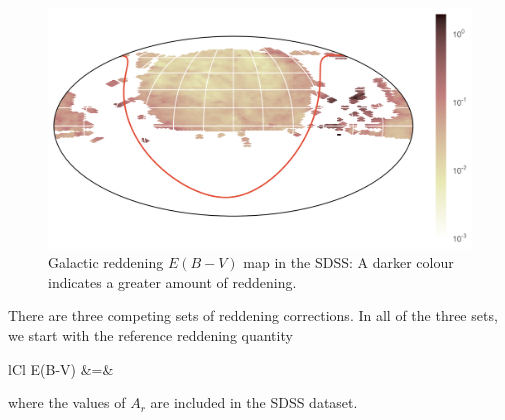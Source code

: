 \begin{figure}[tbp]
	\centering
	\includegraphics[width=\textwidth]{figures/map_extinction_ebv}
	\caption[Galactic reddening map in the SDSS]{Galactic reddening $E(B-V)$ map in the SDSS:
		A darker colour indicates a greater amount of reddening.}
	\label{fig:reddening}
\end{figure}

There are three competing sets of reddening corrections. In all of the three sets, we
start with the reference reddening quantity
	\begin{IEEEeqnarray*}{lCl}
		E(B-V) &=& 
	\end{IEEEeqnarray*}
where the values of $A_r$ are included in the SDSS dataset.


